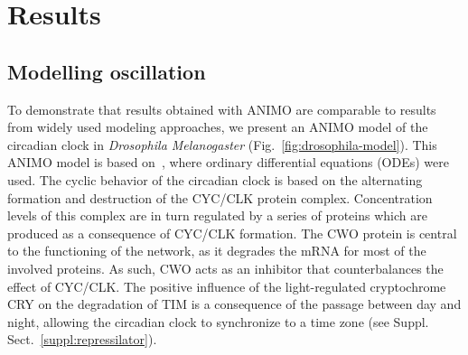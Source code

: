 \documentclass{bmcart}
\begin{document}



\section*{Results}\label{sec:results}
\subsection*{Modelling oscillation}\label{sec:animo-drosophila}
To demonstrate that results obtained with ANIMO are comparable to results from widely used modeling
approaches, we present 
an ANIMO model of the circadian clock in \emph{Drosophila Melanogaster} (Fig.~\ref{fig:drosophila-model}).
This ANIMO model is based on~\cite{drosophila-ode-model},
where ordinary differential equations (ODEs) were used.
The cyclic behavior of the circadian clock is based on the alternating formation and destruction of the
CYC/CLK protein complex.
Concentration levels of this complex are in turn regulated by a series of proteins which are produced as
a consequence of CYC/CLK formation. The CWO protein
is central to the functioning of the network, as it degrades the mRNA for most of the involved proteins.
As such, CWO acts as an inhibitor that counterbalances the effect of CYC/CLK.
The positive influence of the light-regulated cryptochrome CRY on the degradation of TIM is a consequence
of the passage between day and night, allowing
the circadian clock to synchronize to a time zone (see Suppl. Sect.~\ref{suppl:repressilator}).
\end{document}
